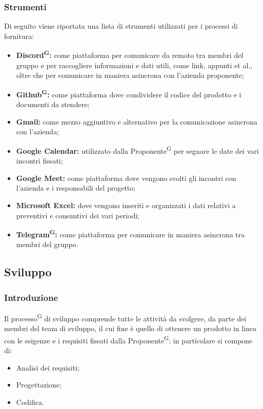 \documentclass[8pt]{article}
\newcommand{\glossterm}[1]{#1\textsuperscript{G}} %
\begin{document}
\subsubsection{Strumenti} 
Di seguito viene riportata una lista di strumenti utilizzati per i processi di fornitura:
\begin{itemize}
    \item \textbf{\glossterm{Discord}:} come piattaforma per comunicare da remoto tra membri del gruppo e per raccogliere informazioni e dati utili, come link, appunti et al., oltre che per comunicare in maniera asincrona con l'azienda proponente;
    \item \textbf{\glossterm{Github}:} come piattaforma dove condividere il codice del prodotto e i documenti da stendere;
    \item \textbf{Gmail:} come mezzo aggiuntivo e alternativo per la comunicazione asincrona con l'azienda;
    \item \textbf{Google Calendar:} utilizzato dalla \glossterm{Proponente} per segnare le date dei vari incontri fissati;
    \item \textbf{Google Meet:} come piattaforma dove vengono svolti gli incontri con l'azienda e i responsabili del progetto; 
    \item \textbf{Microsoft Excel:} dove vengono inseriti e organizzati i dati relativi a preventivi e consuntivi dei vari periodi; 
    \item \textbf{\glossterm{Telegram}:} come piattaforma per comunicare in maniera asincrona tra membri del gruppo. 
\end{itemize}

\subsection{Sviluppo}

\subsubsection{Introduzione} 
Il \glossterm{processo} di sviluppo comprende tutte le attività da svolgere, da parte dei membri del team di sviluppo, il cui fine è quello di ottenere un prodotto in linea con le esigenze e i requisiti fissati dalla \glossterm{Proponente}; in particolare si compone di:
\begin{itemize}
    \item Analisi dei requisiti;
    \item Progettazione;
    \item Codifica.
\end{itemize} 
\end{document}
